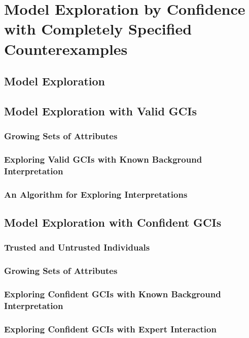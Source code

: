 
\chapter[Model Exploration by Confidence]{Model Exploration by Confidence with Completely Specified Counterexamples}
\label{cha:model-expl-conf}

\section{Model Exploration}
\label{sec:model-exploration}

%

\section{Model Exploration with Valid GCIs}
\label{sec:model-expl-with}


\subsection{Growing Sets of Attributes}
\label{sec:grow-sets-attr}

\subsection{Exploring Valid GCIs with Known Background Interpretation}
\label{sec:comp-bases-given}

\subsection{An Algorithm for Exploring Interpretations}
\label{sec:an-algor-expl}

\section{Model Exploration with Confident GCIs}
\label{sec:model-expl-with-1}

%

\subsection{Trusted and Untrusted Individuals}
\label{sec:trust-untr-indiv}

\subsection{Growing Sets of Attributes}
\label{sec:grow-sets-attr-1}

\subsection{Exploring Confident GCIs with Known Background Interpretation}
\label{sec:expl-conf-gcis}

\subsection{Exploring Confident GCIs with Expert Interaction}
\label{sec:expl-conf-gcis-1}

